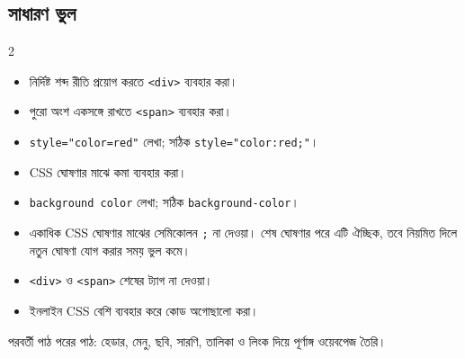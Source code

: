 \subsection{সাধারণ ভুল}

\begin{multicols}{2}
\begin{itemize}
\item নির্দিষ্ট শব্দ রীতি প্রয়োগ করতে \texttt{<div>} ব্যবহার করা।
\item পুরো অংশ একসঙ্গে রাখতে \texttt{<span>} ব্যবহার করা।
\item \texttt{style="color=red"} লেখা; সঠিক \texttt{style="color:red;"}।
\item CSS ঘোষণার মাঝে কমা ব্যবহার করা।
\item \texttt{background color} লেখা; সঠিক \texttt{background-color}।
\item একাধিক CSS ঘোষণার মাঝের সেমিকোলন \texttt{;} না দেওয়া। শেষ ঘোষণার পরে এটি ঐচ্ছিক, তবে নিয়মিত দিলে নতুন ঘোষণা যোগ করার সময় ভুল কমে।
\item \texttt{<div>} ও \texttt{<span>} শেষের ট্যাগ না দেওয়া।
\item ইনলাইন CSS বেশি ব্যবহার করে কোড অগোছালো করা।
\end{itemize}
\end{multicols}


\begin{boardbox}{পরবর্তী পাঠ}
পরের পাঠ: হেডার, মেনু, ছবি, সারণি, তালিকা ও লিংক দিয়ে পূর্ণাঙ্গ ওয়েবপেজ তৈরি।
\end{boardbox}
